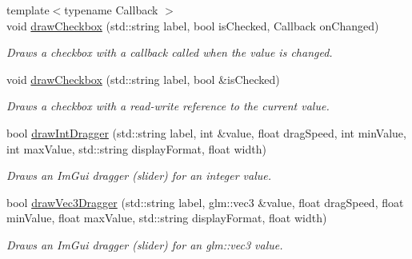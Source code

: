 \begin{DoxyCompactItemize}
\mbox{\label{classpepr3d_1_1_side_pane_aa585367929e09354f49e0740571f475b}} 
{\footnotesize template$<$typename Callback $>$ }\\void \mbox{\hyperlink{classpepr3d_1_1_side_pane_aa585367929e09354f49e0740571f475b}{draw\+Checkbox}} (std\+::string label, bool is\+Checked, Callback on\+Changed)
\begin{DoxyCompactList}\small\item\em Draws a checkbox with a callback called when the value is changed. \end{DoxyCompactList}\item 
\mbox{\label{classpepr3d_1_1_side_pane_a65b9063ac82c6249eef2c1a7586a0cfb}} 
void \mbox{\hyperlink{classpepr3d_1_1_side_pane_a65b9063ac82c6249eef2c1a7586a0cfb}{draw\+Checkbox}} (std\+::string label, bool \&is\+Checked)
\begin{DoxyCompactList}\small\item\em Draws a checkbox with a read-\/write reference to the current value. \end{DoxyCompactList}\item 
\mbox{\label{classpepr3d_1_1_side_pane_ae31dbf3dc9f11c3a4a2721c59ca043df}} 
bool \mbox{\hyperlink{classpepr3d_1_1_side_pane_ae31dbf3dc9f11c3a4a2721c59ca043df}{draw\+Int\+Dragger}} (std\+::string label, int \&value, float drag\+Speed, int min\+Value, int max\+Value, std\+::string display\+Format, float width)
\begin{DoxyCompactList}\small\item\em Draws an Im\+Gui dragger (slider) for an integer value. \end{DoxyCompactList}\item 
\mbox{\label{classpepr3d_1_1_side_pane_a284ec9b8a323a0b4bf01fddb8551d4b2}} 
bool \mbox{\hyperlink{classpepr3d_1_1_side_pane_a284ec9b8a323a0b4bf01fddb8551d4b2}{draw\+Vec3\+Dragger}} (std\+::string label, glm\+::vec3 \&value, float drag\+Speed, float min\+Value, float max\+Value, std\+::string display\+Format, float width)
\begin{DoxyCompactList}\small\item\em Draws an Im\+Gui dragger (slider) for an glm\+::vec3 value. \end{DoxyCompactList}\item 

\end{DoxyCompactItemize}

